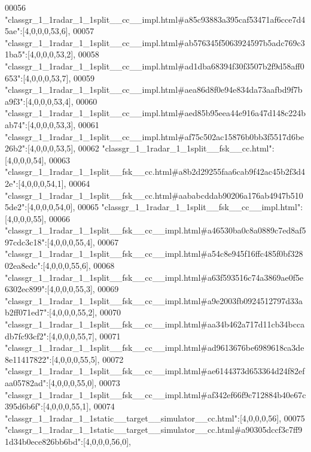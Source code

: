 \begin{DoxyCode}
00056 \textcolor{stringliteral}{"classgr\_1\_1radar\_1\_1split\_\_cc\_\_impl.html#a85c93883a395caf53471af6cce7d45ae"}:[4,0,0,0,53,6],
00057 \textcolor{stringliteral}{"classgr\_1\_1radar\_1\_1split\_\_cc\_\_impl.html#ab576345f5063924597b5adc769c31ba5"}:[4,0,0,0,53,2],
00058 \textcolor{stringliteral}{"classgr\_1\_1radar\_1\_1split\_\_cc\_\_impl.html#ad1dba68394f30f3507b2f9d58aff0653"}:[4,0,0,0,53,7],
00059 \textcolor{stringliteral}{"classgr\_1\_1radar\_1\_1split\_\_cc\_\_impl.html#aea86d8f0e94e834da73aafbd9f7ba9f3"}:[4,0,0,0,53,4],
00060 \textcolor{stringliteral}{"classgr\_1\_1radar\_1\_1split\_\_cc\_\_impl.html#aed85b95eea44e916a47d148c224bab74"}:[4,0,0,0,53,3],
00061 \textcolor{stringliteral}{"classgr\_1\_1radar\_1\_1split\_\_cc\_\_impl.html#af75c502ac15876b0bb3f5517d6be26b2"}:[4,0,0,0,53,5],
00062 \textcolor{stringliteral}{"classgr\_1\_1radar\_1\_1split\_\_fsk\_\_cc.html"}:[4,0,0,0,54],
00063 \textcolor{stringliteral}{"classgr\_1\_1radar\_1\_1split\_\_fsk\_\_cc.html#a8b2d29255faa6cab9f42ac45b2f3d42e"}:[4,0,0,0,54,1],
00064 \textcolor{stringliteral}{"classgr\_1\_1radar\_1\_1split\_\_fsk\_\_cc.html#aababcddab90206a176ab4947b5105de2"}:[4,0,0,0,54,0],
00065 \textcolor{stringliteral}{"classgr\_1\_1radar\_1\_1split\_\_fsk\_\_cc\_\_impl.html"}:[4,0,0,0,55],
00066 \textcolor{stringliteral}{"classgr\_1\_1radar\_1\_1split\_\_fsk\_\_cc\_\_impl.html#a46530ba0c8a0889c7ed8af597cdc3c18"}:[4,0,0,0,55,4],
00067 \textcolor{stringliteral}{"classgr\_1\_1radar\_1\_1split\_\_fsk\_\_cc\_\_impl.html#a54c8e945f16ffc485f0bf32802ea8edc"}:[4,0,0,0,55,6],
00068 \textcolor{stringliteral}{"classgr\_1\_1radar\_1\_1split\_\_fsk\_\_cc\_\_impl.html#a63f593516c74a3869ae0f5e6302ec899"}:[4,0,0,0,55,3],
00069 \textcolor{stringliteral}{"classgr\_1\_1radar\_1\_1split\_\_fsk\_\_cc\_\_impl.html#a9e2003fb0924512797d33ab2ff071ed7"}:[4,0,0,0,55,2],
00070 \textcolor{stringliteral}{"classgr\_1\_1radar\_1\_1split\_\_fsk\_\_cc\_\_impl.html#aa34b462a717d11cb34bccadb7fc93cf2"}:[4,0,0,0,55,7],
00071 \textcolor{stringliteral}{"classgr\_1\_1radar\_1\_1split\_\_fsk\_\_cc\_\_impl.html#ad9613676be6989618ca3de8e11417822"}:[4,0,0,0,55,5],
00072 \textcolor{stringliteral}{"classgr\_1\_1radar\_1\_1split\_\_fsk\_\_cc\_\_impl.html#ae6144373d653364d24f82efaa05782ad"}:[4,0,0,0,55,0],
00073 \textcolor{stringliteral}{"classgr\_1\_1radar\_1\_1split\_\_fsk\_\_cc\_\_impl.html#af342ef66f9c712884b40e67c395d6b6f"}:[4,0,0,0,55,1],
00074 \textcolor{stringliteral}{"classgr\_1\_1radar\_1\_1static\_\_target\_\_simulator\_\_cc.html"}:[4,0,0,0,56],
00075 \textcolor{stringliteral}{"classgr\_1\_1radar\_1\_1static\_\_target\_\_simulator\_\_cc.html#a90305dccf3c7ff91d34b0ece826bb6bd"}:[4,0,0,0,56,0],

\end{DoxyCode}
